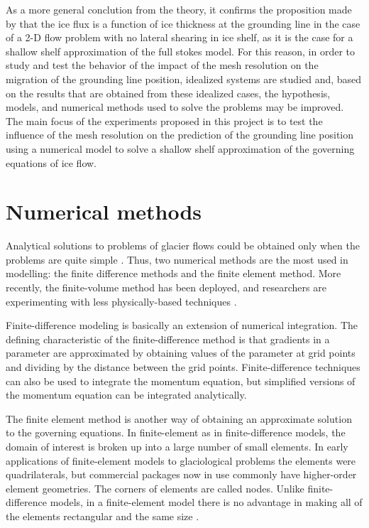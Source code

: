 \documentclass{article}
\begin{document}
As a more general conclution from the theory, it confirms the proposition made by \cite{weertman1974stability} that the ice flux is a function of ice thickness at the grounding line in the case of a 2-D flow problem with no lateral shearing in ice shelf, as it is the case for a shallow shelf approximation of the full stokes model. For this reason, in order to study and test the behavior of the impact of the mesh resolution on the migration of the grounding line position, idealized systems are studied and, based on the results that are obtained from these idealized cases, the hypothesis, models, and numerical methods used to solve the problems may be improved. The main focus of the experiments proposed in this project is to test the influence of the mesh resolution on the prediction of the grounding line position using a numerical model to solve a shallow shelf approximation of the governing equations of ice flow. 

\section{Numerical methods}
\label{Numerical_methods}
Analytical solutions to problems of glacier flows could be obtained only when the problems are quite simple \cite{hooke2019principles}. Thus, two numerical methods are the most used in modelling: the finite difference methods and the finite element method. More recently, the finite-volume method has been deployed, and researchers are experimenting with less physically-based techniques \cite{hooke2019principles}.

Finite-difference modeling is basically an extension of numerical integration. The deﬁning characteristic of the ﬁnite-difference method is that gradients in a parameter are approximated by obtaining values of the parameter at grid points and dividing by the distance between the grid points. Finite-difference techniques can also be used to integrate the momentum equation, but simpliﬁed versions of the momentum equation can be integrated analytically.

The ﬁnite element method is another way of obtaining an approximate solution to
the governing equations. In ﬁnite-element as in ﬁnite-difference models, the
domain of interest is broken up into a large number of small elements. In early
applications of ﬁnite-element models to glaciological problems the elements were
quadrilaterals, but commercial packages now in use commonly have higher-order
element geometries. The corners of elements are called nodes. Unlike ﬁnite-
difference models, in a ﬁnite-element model there is no advantage in making all
of the elements rectangular and the same size \cite{hooke2019principles}.
\end{document}
